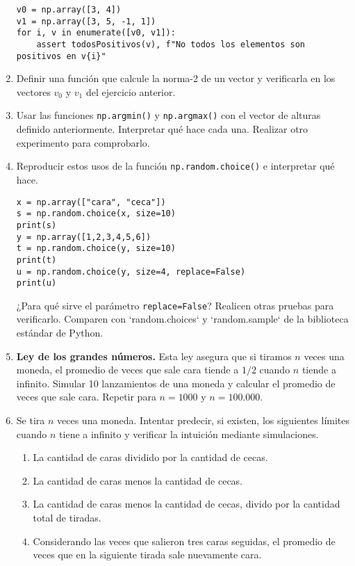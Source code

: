 \documentclass[a4paper,11pt]{article}
\theoremstyle{definition}
\begin{document}
\begin{enumerate}[resume]
\begin{lstlisting}
v0 = np.array([3, 4])
v1 = np.array([3, 5, -1, 1])
for i, v in enumerate([v0, v1]):
    assert todosPositivos(v), f"No todos los elementos son positivos en v{i}"
\end{lstlisting}

\item Definir una función que calcule la norma-2 de un vector y verificarla en los vectores $v_0$ y $v_1$ del ejercicio anterior.

\item Usar las funciones \lstinline{np.argmin()} y \lstinline{np.argmax()} con el vector de alturas definido anteriormente. Interpretar qué hace cada una. Realizar otro experimento para comprobarlo.

\item Reproducir estos usos de la función \lstinline{np.random.choice()} e interpretar qué hace.
\begin{lstlisting}
x = np.array(["cara", "ceca"])
s = np.random.choice(x, size=10)
print(s)
y = np.array([1,2,3,4,5,6])
t = np.random.choice(y, size=10)
print(t)
u = np.random.choice(y, size=4, replace=False)
print(u)
\end{lstlisting}

¿Para qué sirve el parámetro \lstinline{replace=False}? Realicen otras pruebas para verificarlo. Comparen con `random.choices` y `random.sample` de la biblioteca estándar de Python.

\item {\textbf{Ley de los grandes números.}} Esta ley asegura que si tiramos $n$ veces una moneda, el promedio de veces que sale cara tiende a $1/2$ cuando $n$ tiende a infinito.
Simular 10 lanzamientos de una moneda y calcular el promedio de veces que sale cara. Repetir para $n = 1000$ y $n = 100.000$.


\item Se tira $n$ veces una moneda. Intentar predecir, si existen, los siguientes límites cuando $n$ tiene a infinito y verificar la intuición mediante simulaciones.

\begin{enumerate}
\item La cantidad de caras dividido por la cantidad de cecas.
\item La cantidad de caras menos la cantidad de cecas.
\item La cantidad de caras menos la cantidad de cecas, divido por la cantidad total de tiradas.
\item Considerando las veces que salieron tres caras seguidas, el promedio de veces que en la siguiente tirada sale nuevamente cara.
\end{enumerate}



\end{enumerate}
\end{document}
